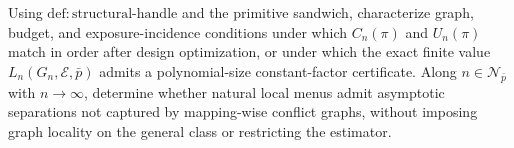Using \(\mathrm{def{:}structural\text{-}handle}\) and the primitive sandwich, characterize graph, budget, and exposure-incidence conditions under which \(C_n(\pi)\) and \(U_n(\pi)\) match in order after design optimization, or under which the exact finite value \(L_n(G_n,\mathcal E,\bar p)\) admits a polynomial-size constant-factor certificate. Along \(n\in\mathcal N_{\bar p}\) with \(n\to\infty\), determine whether natural local menus admit asymptotic separations not captured by mapping-wise conflict graphs, without imposing graph locality on the general class or restricting the estimator.